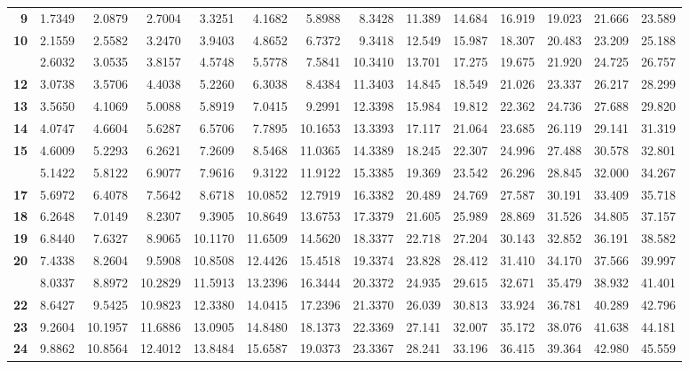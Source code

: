 \documentclass[]{article}
\begin{document}
\begin{longtable}{>{\bfseries}r|rrrrrrrrrrrrr}
9 & 1.7349 & 2.0879 & 2.7004 & 3.3251 & 4.1682 & 5.8988 & 8.3428 & 11.389 & 14.684 & 16.919 & 19.023 & 21.666 & 23.589\\
10 & 2.1559 & 2.5582 & 3.2470 & 3.9403 & 4.8652 & 6.7372 & 9.3418 & 12.549 & 15.987 & 18.307 & 20.483 & 23.209 & 25.188\\
\addlinespace
11 & 2.6032 & 3.0535 & 3.8157 & 4.5748 & 5.5778 & 7.5841 & 10.3410 & 13.701 & 17.275 & 19.675 & 21.920 & 24.725 & 26.757\\
12 & 3.0738 & 3.5706 & 4.4038 & 5.2260 & 6.3038 & 8.4384 & 11.3403 & 14.845 & 18.549 & 21.026 & 23.337 & 26.217 & 28.299\\
13 & 3.5650 & 4.1069 & 5.0088 & 5.8919 & 7.0415 & 9.2991 & 12.3398 & 15.984 & 19.812 & 22.362 & 24.736 & 27.688 & 29.820\\
14 & 4.0747 & 4.6604 & 5.6287 & 6.5706 & 7.7895 & 10.1653 & 13.3393 & 17.117 & 21.064 & 23.685 & 26.119 & 29.141 & 31.319\\
15 & 4.6009 & 5.2293 & 6.2621 & 7.2609 & 8.5468 & 11.0365 & 14.3389 & 18.245 & 22.307 & 24.996 & 27.488 & 30.578 & 32.801\\
\addlinespace
16 & 5.1422 & 5.8122 & 6.9077 & 7.9616 & 9.3122 & 11.9122 & 15.3385 & 19.369 & 23.542 & 26.296 & 28.845 & 32.000 & 34.267\\
17 & 5.6972 & 6.4078 & 7.5642 & 8.6718 & 10.0852 & 12.7919 & 16.3382 & 20.489 & 24.769 & 27.587 & 30.191 & 33.409 & 35.718\\
18 & 6.2648 & 7.0149 & 8.2307 & 9.3905 & 10.8649 & 13.6753 & 17.3379 & 21.605 & 25.989 & 28.869 & 31.526 & 34.805 & 37.157\\
19 & 6.8440 & 7.6327 & 8.9065 & 10.1170 & 11.6509 & 14.5620 & 18.3377 & 22.718 & 27.204 & 30.143 & 32.852 & 36.191 & 38.582\\
20 & 7.4338 & 8.2604 & 9.5908 & 10.8508 & 12.4426 & 15.4518 & 19.3374 & 23.828 & 28.412 & 31.410 & 34.170 & 37.566 & 39.997\\
\addlinespace
21 & 8.0337 & 8.8972 & 10.2829 & 11.5913 & 13.2396 & 16.3444 & 20.3372 & 24.935 & 29.615 & 32.671 & 35.479 & 38.932 & 41.401\\
22 & 8.6427 & 9.5425 & 10.9823 & 12.3380 & 14.0415 & 17.2396 & 21.3370 & 26.039 & 30.813 & 33.924 & 36.781 & 40.289 & 42.796\\
23 & 9.2604 & 10.1957 & 11.6886 & 13.0905 & 14.8480 & 18.1373 & 22.3369 & 27.141 & 32.007 & 35.172 & 38.076 & 41.638 & 44.181\\
24 & 9.8862 & 10.8564 & 12.4012 & 13.8484 & 15.6587 & 19.0373 & 23.3367 & 28.241 & 33.196 & 36.415 & 39.364 & 42.980 & 45.559\\

\end{longtable}
\end{document}
